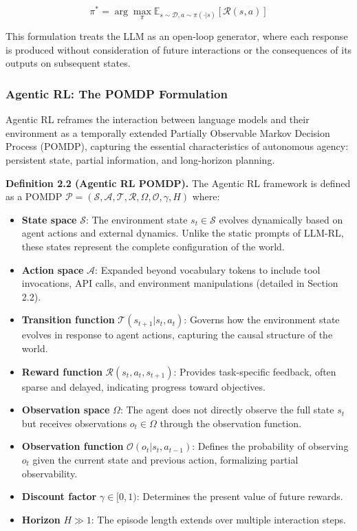 $$\pi^* = \arg\max_{\pi} \mathbb{E}_{s \sim \mathcal{D}, a \sim \pi(\cdot|s)}[\mathcal{R}(s, a)]$$

This formulation treats the LLM as an open-loop generator, where each response is produced without consideration of future interactions or the consequences of its outputs on subsequent states.

\subsubsection{Agentic RL: The POMDP Formulation}

Agentic RL reframes the interaction between language models and their environment as a temporally extended Partially Observable Markov Decision Process (POMDP), capturing the essential characteristics of autonomous agency: persistent state, partial information, and long-horizon planning.

\textbf{Definition 2.2 (Agentic RL POMDP).} The Agentic RL framework is defined as a POMDP $\mathcal{P} = (\mathcal{S}, \mathcal{A}, \mathcal{T}, \mathcal{R}, \Omega, \mathcal{O}, \gamma, H)$ where:

\begin{itemize}
    \item \textbf{State space} $\mathcal{S}$: The environment state $s_t \in \mathcal{S}$ evolves dynamically based on agent actions and external dynamics. Unlike the static prompts of LLM-RL, these states represent the complete configuration of the world.

    \item \textbf{Action space} $\mathcal{A}$: Expanded beyond vocabulary tokens to include tool invocations, API calls, and environment manipulations (detailed in Section 2.2).

    \item \textbf{Transition function} $\mathcal{T}(s_{t+1} | s_t, a_t)$: Governs how the environment state evolves in response to agent actions, capturing the causal structure of the world.

    \item \textbf{Reward function} $\mathcal{R}(s_t, a_t, s_{t+1})$: Provides task-specific feedback, often sparse and delayed, indicating progress toward objectives.

    \item \textbf{Observation space} $\Omega$: The agent does not directly observe the full state $s_t$ but receives observations $o_t \in \Omega$ through the observation function.

    \item \textbf{Observation function} $\mathcal{O}(o_t | s_t, a_{t-1})$: Defines the probability of observing $o_t$ given the current state and previous action, formalizing partial observability.

    \item \textbf{Discount factor} $\gamma \in [0, 1)$: Determines the present value of future rewards.

    \item \textbf{Horizon} $H \gg 1$: The episode length extends over multiple interaction steps.

\end{itemize}
